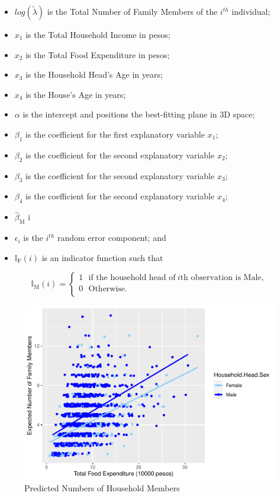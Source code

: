 \documentclass[
]{article}
\providecommand{\tightlist}{%
  \setlength{\itemsep}{0pt}\setlength{\parskip}{0pt}}
\begin{document}
\begin{itemize}
\tightlist
\item
  \(log(\tilde{\lambda})\) is the Total Number of Family Members of the
  \(i^{th}\) individual;
\item
  \(x_1\) is the Total Household Income in pesos;
\item
  \(x_2\) is the Total Food Expenditure in pesos;
\item
  \(x_3\) is the Household Head's Age in years;
\item
  \(x_4\) is the House's Age in years;
\item
  \(\alpha\) is the intercept and positions the best-fitting plane in 3D
  space;
\item
  \(\beta_1\) is the coefficient for the first explanatory variable
  \(x_1\);
\item
  \(\beta_2\) is the coefficient for the second explanatory variable
  \(x_2\);
\item
  \(\beta_3\) is the coefficient for the second explanatory variable
  \(x_3\);
\item
  \(\beta_4\) is the coefficient for the second explanatory variable
  \(x_4\);
\item
  \(\widehat{\beta}_{\mbox{M}}\) i
\item
  \(\epsilon_i\) is the \(i^{th}\) random error component; and
\item
  \(\mathbb{I}_{\mbox{F}}(i)\) is an indicator function such that
\end{itemize}

\[\mathbb{I}_{\mbox{M}}(i)=\left\{
\begin{array}{ll}
1 ~~~ \mbox{if the household head of} ~ i \mbox{th observation is Male},\\
0 ~~~ \mbox{Otherwise}.\\
\end{array}
\right.\]

\begin{figure}[H]

{\centering \includegraphics[width=0.8\linewidth]{Group_01_Project2_demo_files/figure-latex/pred plot-1} 

}

\caption{Predicted Numbers of Household Members}\label{fig:pred plot}
\end{figure}
\end{document}
